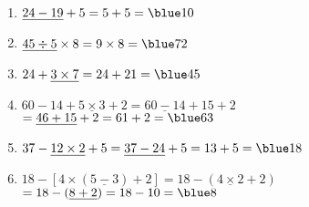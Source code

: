    \ \\ [-5mm]
   \begin{enumerate}
      \item $\underline{24-19}+5 =5+5 =\blue 10$ \smallskip
      \item $\underline{45\div5}\times8 =9\times8 =\blue 72$ \smallskip
      \item $24+\underline{3\times7} =24+21 =\blue 45$ \smallskip
      \item $60-14+\underline{5\times3}+2 =\underline{60-14}+15+2$ \\
         \hspace*{33mm} $=\underline{46+15}+2 =61+2 =\blue 63$ \smallskip
      \item $37-\underline{12\times2}+5 =\underline{37-24}+5 =13+5 =\blue 18$ \smallskip
      \item $18-[4\times(\underline{5-3})+2] =18-(\underline{4\times2}+2)$ \\
         \hspace*{35.6mm} $=18-(\underline{8+2}) =18-10 =\blue 8$
   \end{enumerate}
